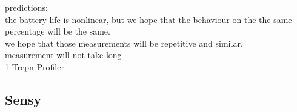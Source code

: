 			
		predictions:\\
			the battery life is nonlinear, but we hope that the behaviour on the the same percentage will be the same.\\
			we hope that those measurements will be repetitive and similar.\\
			measurement will not take long\\
			1%
	Trepn Profiler\\
			
			
		
		
		
\subsection{Sensy}
\label{s:design:sensy}
